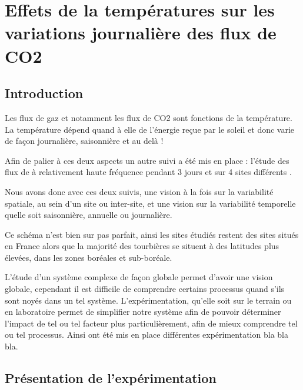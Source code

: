 \chapter{Effets de la températures sur les variations journalière des flux de CO2}
\newpage

\section{Introduction}
Les flux de gaz et notamment les flux de CO2 sont fonctions de la température.
La température dépend quand à elle de l'énergie reçue par le soleil et donc varie de façon journalière, saisonnière et au delà !

Afin de palier à ces deux aspects un autre suivi a été mis en place : l'étude des flux de \COO à relativement haute fréquence  pendant 3 jours et sur 4 sites différents .

Nous avons donc avec ces deux suivis, une vision à la fois sur la variabilité spatiale, au sein d'un site ou inter-site, et une vision sur la variabilité temporelle quelle soit saisonnière, annuelle ou journalière.

Ce schéma n'est bien sur pas parfait, ainsi les sites étudiés restent des sites situés en France alors que la majorité des tourbières se situent à des latitudes plus élevées, dans les zones boréales et sub-boréale.


L'étude d'un système complexe de façon globale permet d'avoir une vision globale, cependant il est difficile de comprendre certains processus quand s'ils sont noyés dans un tel système. 
L'expérimentation, qu'elle soit sur le terrain ou en laboratoire permet de simplifier notre système afin de pouvoir déterminer l'impact de tel ou tel facteur plus particulièrement, afin de mieux comprendre tel ou tel processus.
Ainsi ont été mis en place différentes expérimentation bla bla bla.

\section{Présentation de l'expérimentation}

